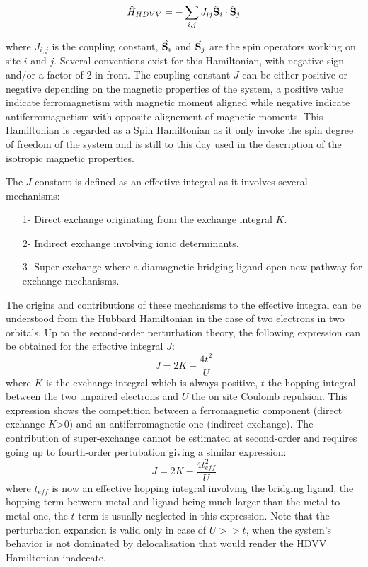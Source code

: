 \documentclass[10pt]{report}
\numberwithin{equation}{section}
\begin{document}
\begin{equation}\label{Hheis}
    \hat{H}_{HDVV}=-\sum_{i,j} J_{ij} \hat{\vb S}_i \cdot \hat{\vb S}_j
\end{equation}

where $J_{i,j}$ is the coupling constant, $\hat{\vb S_i}$ and $\hat{\vb S_j}$ are the spin operators working on site $i$ and $j$.
Several conventions exist for this Hamiltonian, with negative sign and/or a factor of 2 in front.  
The coupling constant $J$ can be either positive or negative depending on the magnetic properties of the system, a positive value indicate ferromagnetism with magnetic moment aligned while negative indicate antiferromagnetism with opposite alignement of magnetic moments.
This Hamiltonian is regarded as a Spin Hamiltonian as it only invoke the spin degree of freedom of the system and is still to this day used in the description of the isotropic magnetic properties.

The $J$ constant is defined as an effective integral as it involves several mechanisms:
\begin{itemize}
    \item[1-] Direct exchange originating from the exchange integral $K$.
    \item[2-] Indirect exchange involving ionic determinants.
    \item[3-] Super-exchange where a diamagnetic bridging ligand open new pathway for exchange mechanisms.
\end{itemize}

The origins and contributions of these mechanisms to the effective integral can be understood from the Hubbard Hamiltonian in the case of two electrons in two orbitals.
Up to the second-order perturbation theory, the following expression can be obtained for the effective integral $J$:
\begin{equation}
    J=2K-\frac{4t^2}{U}
\end{equation}
where $K$ is the exchange integral which is always positive, $t$ the hopping integral between the two unpaired electrons and $U$ the on site Coulomb repulsion.
This expression shows the competition between a ferromagnetic component (direct exchange $K$>0) and an antiferromagnetic one (indirect exchange).
The contribution of super-exchange cannot be estimated at second-order and requires going up to fourth-order pertubation giving a similar expression:
\begin{equation}
    J=2K-\frac{4t_{eff}^2}{U}
\end{equation}
where $t_{eff}$ is now an effective hopping integral involving the bridging ligand, the hopping term between metal and ligand being much larger than the metal to metal one, the $t$ term is usually neglected in this expression.
Note that the perturbation expansion is valid only in case of $U>>t$, when the system's behavior is not dominated by delocalisation that would render the HDVV Hamiltonian inadecate.
\end{document}
